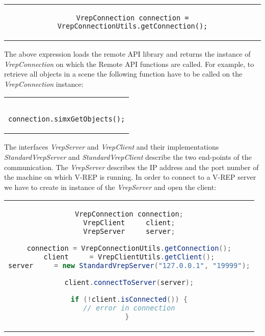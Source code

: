 \begin{center}
\begin{tabular}{c}
\begin{lstlisting}[basicstyle=\small]
VrepConnection connection = VrepConnectionUtils.getConnection();
\end{lstlisting}
\end{tabular}
\end{center}

The above expression loads the remote API library and returns the instance of \textit{VrepConnection} on which the Remote API functions are called. 
For example, to retrieve all objects in a scene the following function have to be called on the \textit{VrepConnection} instance:

\begin{center}
\begin{tabular}{c}
\begin{lstlisting}[basicstyle=\small]

connection.simxGetObjects();

\end{lstlisting}
\end{tabular}
\end{center}

The interfaces \textit{VrepServer} and \textit{VrepClient} and their implementations \textit{StandardVrepServer} and \textit{StandardVrepClient} describe the two end-points of the communication. The \textit{VrepServer} describes the IP address and the port number of the machine on which  V-REP is running. In order to connect to a V-REP server we have to create in instance of the \textit{VrepServer} and open the client:

\begin{center}
\begin{tabular}{c}
\begin{lstlisting}[basicstyle=\small, language=Java, caption={Open V-REP Remote API connection}]
VrepConnection connection;
VrepClient     client;
VrepServer     server;

connection = VrepConnectionUtils.getConnection();
client     = VrepClientUtils.getClient();
server     = new StandardVrepServer("127.0.0.1", "19999");

client.connectToServer(server);

if (!client.isConnected()) {
// error in connection
} 
\end{lstlisting}
\end{tabular}
\end{center}

